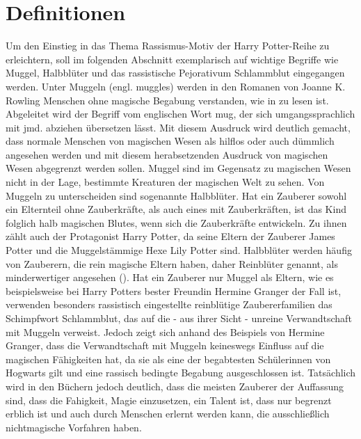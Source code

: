 \section{Definitionen}
Um den Einstieg in das Thema \glqq Rassismus-Motiv der  \glq Harry Potter\grq-Reihe\grqq{} zu erleichtern, soll im folgenden Abschnitt exemplarisch auf wichtige Begriffe wie \glqq Muggel\grqq, \glqq Halbblüter\grqq{} und das rassistische Pejorativum \glqq Schlammblut\grqq{} eingegangen werden.
Unter \glqq Muggeln\grqq{} (engl. muggles) werden in den Romanen von Joanne K. Rowling Menschen ohne magische Begabung verstanden, wie in \cite[S. 61]{JKR97} zu lesen ist. Abgeleitet wird der Begriff vom englischen Wort mug, der sich umgangssprachlich mit \glqq jmd. abziehen\grqq{} übersetzen lässt. Mit diesem Ausdruck wird deutlich gemacht, dass \glqq normale\grqq{} Menschen von magischen Wesen als hilflos oder auch dümmlich angesehen werden und mit diesem herabsetzenden Ausdruck von magischen Wesen abgegrenzt werden sollen. Muggel sind im Gegensatz zu magischen Wesen nicht in der Lage, bestimmte Kreaturen der magischen Welt zu sehen.
Von Muggeln zu unterscheiden sind sogenannte \glqq Halbblüter\grqq. Hat ein Zauberer sowohl ein Elternteil ohne Zauberkräfte, als auch eines mit Zauberkräften, ist das Kind folglich halb magischen \glqq Blutes\grqq, wenn sich die Zauberkräfte entwickeln. Zu ihnen zählt auch der Protagonist Harry Potter, da seine Eltern der Zauberer James Potter und die Muggelstämmige Hexe Lily Potter sind.
Halbblüter werden häufig von Zauberern, die rein magische Eltern haben, daher \glqq Reinblüter\grqq{} genannt, als minderwertiger angesehen (\cite[S.220]{JKR03}). Hat ein Zauberer nur Muggel als Eltern, wie es beispielsweise bei Harry Potters bester Freundin Hermine Granger der Fall ist, verwenden besonders rassistisch eingestellte reinblütige Zaubererfamilien das Schimpfwort \glqq Schlammblut\grqq, das auf die - aus ihrer Sicht -  \glqq unreine\grqq{} Verwandtschaft mit Muggeln verweist.
Jedoch zeigt sich anhand des Beispiels von Hermine Granger, dass die Verwandtschaft mit Muggeln keineswegs Einfluss auf die magischen Fähigkeiten hat, da sie als eine der begabtesten Schülerinnen von Hogwarts gilt und eine rassisch bedingte Begabung ausgeschlossen ist.
Tatsächlich wird in den Büchern jedoch deutlich, dass die meisten Zauberer der Auffassung sind, dass die Fahigkeit, Magie einzusetzen, ein Talent ist, dass nur begrenzt erblich ist und auch durch Menschen erlernt werden kann, die ausschließlich nichtmagische Vorfahren haben. 

